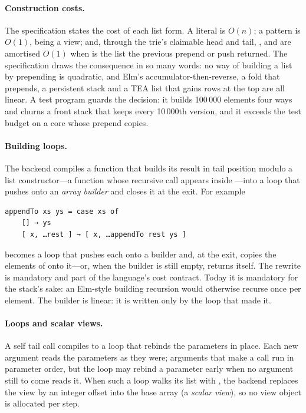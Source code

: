 \paragraph{Construction costs.} The specification states the cost of each list form. A literal is
$O(n)$; a pattern \code{[ x, …rest ]} is $O(1)$,  being a view; and, through the trie's
claimable head and tail, \code{[ x, …xs ]}, \code{[ …xs, x ]} and  are amortised
$O(1)$ when  is the list the previous prepend or push returned. The specification draws the
consequence in so many words: no way of building a list by prepending is quadratic, and Elm's
accumulator-then-reverse, a fold that prepends, a persistent stack and a TEA list that gains rows at the
top are all linear. A test program guards the decision: it builds 100\,000 elements four ways and
churns a front stack that keeps every 10\,000th version, and it exceeds the test budget on a core
whose prepend copies.

\paragraph{Building loops.} The backend compiles a function that builds its result in tail position
modulo a list constructor---a function whose recursive call appears inside ---into a loop
that pushes onto an \emph{array builder} and closes it at the exit. For example
\begin{Verbatim}
appendTo xs ys = case xs of
    [] → ys
    [ x, …rest ] → [ x, …appendTo rest ys ]
\end{Verbatim}
becomes a loop that pushes each  onto a builder and, at the exit, copies the elements of
 onto it---or, when the builder is still empty, returns  itself. The rewrite is
mandatory and part of the language's cost contract. Today it is mandatory for the stack's sake: an
Elm-style building recursion would otherwise recurse once per element. The builder is linear: it is
written only by the loop that made it.

\paragraph{Loops and scalar views.} A self tail call compiles to a loop that rebinds the parameters
in place. Each new argument reads the parameters as they were; arguments that make a call run in
parameter order, but the loop may rebind a parameter early when no argument still to come reads
it. When such a loop walks its list with
\code{[ x, …rest ]}, the backend replaces the view by an integer offset into the base array (a
\emph{scalar view}), so no view object is allocated per step.


